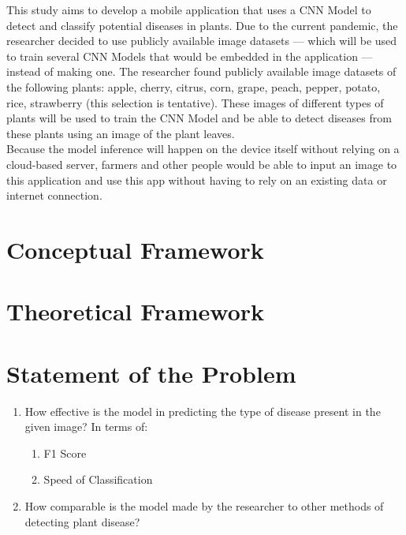 
This study aims to develop a mobile application that uses a 
CNN Model  to detect and classify potential diseases in 
plants. Due to the current pandemic, the researcher decided to use publicly 
available image datasets — which will be used to train several CNN Models 
that would be embedded in the application — instead of making one. The researcher 
found publicly available image datasets of the following plants:
apple, cherry, citrus, corn, grape, peach, pepper, potato,
rice, strawberry (this selection is tentative). These images of different types 
of plants will be used to train the CNN Model and be able to detect diseases from 
these plants using an image of the plant leaves. \\ 

Because the model inference will
happen on the device itself without relying on a cloud-based server, 
farmers and other people would be able to input an image to this application 
and use this app without having to rely on an 
existing data or internet connection. 



\section{Conceptual Framework}

\section{Theoretical Framework}

\section{Statement of the Problem}

    \begin{enumerate}
    \item How effective is the model in predicting the
    type of disease present in the given image? 
    In terms of:

        \begin{enumerate}
            \item F1 Score 
            \item Speed of Classification 
        \end{enumerate}

    \item How comparable is the model made by the researcher 
    to other methods of detecting plant disease? 
    \end{enumerate}

